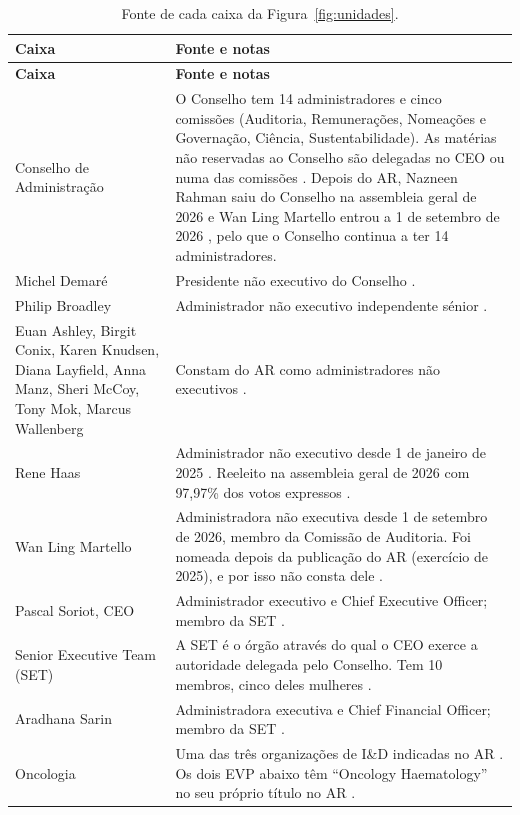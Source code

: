 \begin{xltabular}{\linewidth}{@{}>{\raggedright\arraybackslash}p{3.4cm}Y@{}}
\caption{Fonte de cada caixa da Figura~\ref{fig:unidades}.}\label{tab:fontes-organograma}\\*
\toprule
\textbf{Caixa} & \textbf{Fonte e notas} \\*
\midrule
\endfirsthead
\toprule
\textbf{Caixa} & \textbf{Fonte e notas} \\*
\midrule
\endhead
\bottomrule
\endfoot
Conselho de Administração & O Conselho tem 14 administradores e cinco comissões (Auditoria, Remunerações, Nomeações e Governação, Ciência, Sustentabilidade). As matérias não reservadas ao Conselho são delegadas no CEO ou numa das comissões \cite[pp.~67--68]{AR}. Depois do AR, Nazneen Rahman saiu do Conselho na assembleia geral de 2026 \cite{AGM26} e Wan Ling Martello entrou a 1 de setembro de 2026 \cite{MART}, pelo que o Conselho continua a ter 14 administradores. \\
Michel Demaré & Presidente não executivo do Conselho \cite[p.~68]{AR}. \\
Philip Broadley & Administrador não executivo independente sénior \cite[p.~68]{AR}. \\
Euan Ashley, Birgit Conix, Karen Knudsen, Diana Layfield, Anna Manz, Sheri McCoy, Tony Mok, Marcus Wallenberg & Constam do AR como administradores não executivos \cite[pp.~68--69]{AR}. \\
Rene Haas & Administrador não executivo desde 1 de janeiro de 2025 \cite[pp.~68--69]{AR}. Reeleito na assembleia geral de 2026 com 97,97\% dos votos expressos \cite{AGM26}. \\
Wan Ling Martello & Administradora não executiva desde 1 de setembro de 2026, membro da Comissão de Auditoria. Foi nomeada depois da publicação do AR (exercício de 2025), e por isso não consta dele \cite{MART}. \\
Pascal Soriot, CEO & Administrador executivo e Chief Executive Officer; membro da SET \cite[pp.~68, 70]{AR}. \\
Senior Executive Team (SET) & A SET é o órgão através do qual o CEO exerce a autoridade delegada pelo Conselho. Tem 10 membros, cinco deles mulheres \cite[pp.~39, 70]{AR}. \\
Aradhana Sarin & Administradora executiva e Chief Financial Officer; membro da SET \cite[pp.~68, 70]{AR}. \\
Oncologia & Uma das três organizações de I\&D indicadas no AR \cite[p.~26]{AR}. Os dois EVP abaixo têm ``Oncology Haematology'' no seu próprio título no AR \cite[p.~70]{AR}. \\

\end{xltabular}
